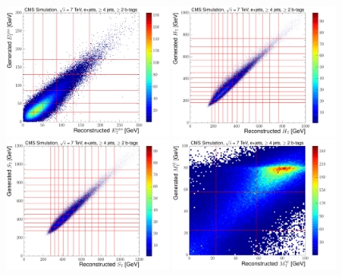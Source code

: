 \begin{figure}[hbtp]
	\centering
     \includegraphics[width=0.48\textwidth]{Chapters/04_Analysis/04b_XSections/images/binning/electron_MET_7TeV.pdf}\hfill
     \includegraphics[width=0.48\textwidth]{Chapters/04_Analysis/04b_XSections/images/binning/electron_HT_7TeV.pdf}\\
     \includegraphics[width=0.48\textwidth]{Chapters/04_Analysis/04b_XSections/images/binning/electron_ST_7TeV.pdf}\hfill
     \includegraphics[width=0.48\textwidth]{Chapters/04_Analysis/04b_XSections/images/binning/electron_MT_7TeV.pdf}\\

\end{figure}
